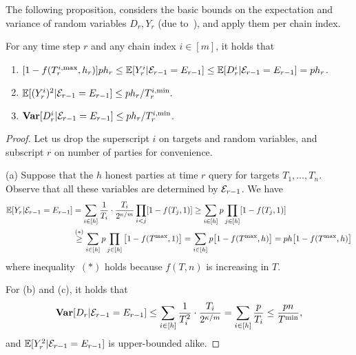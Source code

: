 The following proposition, considers the basic bounds on the expectation and variance of random variables $D_r, Y_r$ (due to~\cite{EPRINT:GarKiaLeo20}), and apply them per chain index.

\begin{proposition} \label{proposition:random-variable-bounds-preliminary}
    For any time step $r$ and any chain index $i \in [m]$, it holds that
    \begin{enumerate}[label=(\alph*), leftmargin=*, nosep]
        \item $[1 - f (T^{i, \mathrm{max}}_r, h_r )] p h_r \le \mathbb{E}[Y^i_r |\mathcal{E}_{r - 1} = E_{r - 1}] \le \mathbb{E}[D^i_r |\mathcal{E}_{r - 1} = E_{r - 1}] = p h_r$.

        \item $\mathbb{E}[(Y^i_r)^2 | \mathcal{E}_{r - 1} = E_{r - 1}] \le p h_r /T^{i, \mathrm{min}}_r.$

        \item $\mathbf{Var}[D^i_r | \mathcal{E}_{r - 1} = E_{r - 1}] \le p h_r / T^{i, \mathrm{min}}_r$.
    \end{enumerate}
\end{proposition}

\begin{proof}
    Let us drop the superscript $i$ on targets and random variables, and subscript $r$ on number of parties for convenience.

    (a) Suppose that the $h$ honest parties at time $r$ query for targets $T_1, \ldots , T_n$.
    Observe that all these variables are determined by $\mathcal{E}_{r - 1}$. We have
    \begin{equation*}
        \begin{aligned}
            \mathbb{E} [Y_r | \mathcal{E}_{r - 1} = E_{r - 1}]
             & =
            \sum_{i \in [h]} \frac{1}{T_i} \cdot \frac{T_i}{2^{\kappa / m}} \prod_{i < j} [1 - f(T_j, 1)]
            \ge
            \sum_{i \in [h]} p \prod_{j \in [h]} [1 - f(T_j, 1)]
            \\
             & \overset{(\ast)}{\ge}
            \sum_{i \in [h]} p \prod_{j \in [h]} \big[ 1 - f(T^{\mathrm{max}}, 1) \big]
            =
            \sum_{i \in [h]} p \big[ 1 - f(T^{\mathrm{max}}, h) \big]
            =
            ph \big[ 1 - f(T^{\mathrm{max}}, h) \big]
        \end{aligned}
    \end{equation*}
    where inequality~$(\ast)$ holds because $f(T, n)$ is increasing in $T$.

    For (b) and (c), it holds that
    \[ \mathbf{Var}[D_r | \mathcal{E}_{r - 1} = E_{r - 1}] \le \sum_{i \in [h]} \frac{1}{T^2_i} \cdot \frac{T_i}{2^{\kappa / m}} = \sum_{i \in [h]} \frac{p}{T_i} \le \frac{pn}{T^{\mathrm{min}}}, \]
    and $\mathbb{E}[Y_r^2 | \mathcal{E}_{r - 1} = E_{r - 1}]$ is upper-bounded alike.
\end{proof}

